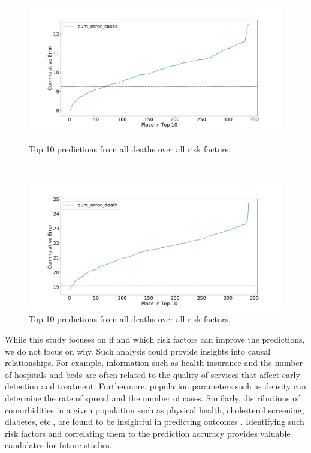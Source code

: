 \documentclass[letterpaper, inpress]{jds} %
\renewcommand{\_}{%
    \textunderscore\hspace{0pt}%
}
\begin{document}
\begin{figure}[!h]
\begin{minipage}{.45\textwidth}
        \centering
        \includegraphics[width=1.0\textwidth]{images/predict/PlaceTop10_Cases.pdf}
        \vspace{-1cm}
        \caption{Top 10 predictions from all deaths  over all risk factors.}
        \label{fig:place-top10-cases}
    \end{minipage}
    \ \
    \begin{minipage}{.45\textwidth}
        
        \centering
        \includegraphics[width=1.0\textwidth]{images/predict/PlaceTop10_Death.pdf}
        \vspace{-1cm}
        \caption{Top 10 predictions from all deaths over all risk factors.}
        \label{fig:place-top10-death}
    \end{minipage}
\end{figure}



While this study focuses on if and which risk factors can improve the
predictions, we do not focus on why. Such analysis could provide
insights into causal relationships. For example, information such as
health insurance and the number of hospitals and beds are often
related to the quality of services that affect early detection and
treatment. Furthermore, population parameters such as density can
determine the rate of spread and the number of cases. Similarly,
distributions of comorbidities in a given population such as physical
health, cholesterol screening, diabetes, etc., are found to be
insightful in predicting outcomes \citep{Maleki}. Identifying such risk
factors and correlating them to the prediction accuracy provides
valuable candidates for future studies.
\end{document}
